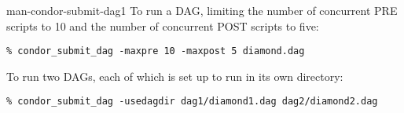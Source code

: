 \begin{ManPage}{}{man-condor-submit-dag}{1}
To run a DAG, limiting the number of concurrent PRE scripts to 10
and the number of concurrent POST scripts to five:
\begin{verbatim}
% condor_submit_dag -maxpre 10 -maxpost 5 diamond.dag
\end{verbatim}

To run two DAGs, each of which is set up to run in its own directory:
\begin{verbatim}
% condor_submit_dag -usedagdir dag1/diamond1.dag dag2/diamond2.dag
\end{verbatim}

\end{ManPage}

